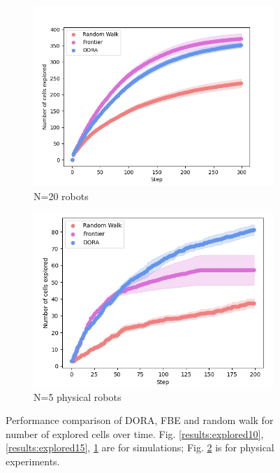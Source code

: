 \begin{figure}
\begin{subfigure}{0.45\textwidth}
        \includegraphics[width=\textwidth]{figures/dora_explorer/explored_20.png}
        \caption{N=20 robots}
        \label{results:explored20}
    \end{subfigure}
    \begin{subfigure}{0.45\textwidth}
        \includegraphics[width=\textwidth]{figures/dora_explorer/explored_real.png}
        \caption{N=5 physical robots}
        \label{results:cells_explored_physical}
    \end{subfigure}
    \caption[DORA cell exploration performance]{Performance comparison of \ac{DORA}, \ac{FBE} and random walk for number of explored cells over time.  Fig. \ref{results:explored10}, \ref{results:explored15}, \ref{results:explored20} are for simulations; Fig. \ref{results:cells_explored_physical} is for physical experiments.}
    \label{results:dora_explored}
\end{figure}

